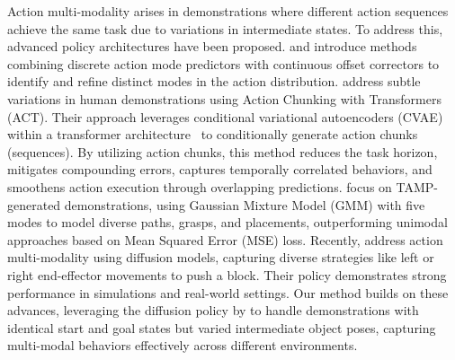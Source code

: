 Action multi-modality arises in demonstrations where different action sequences achieve the same task due to variations in intermediate states. To address this, advanced policy architectures have been proposed. \citet{lee2024behavior} and \citet{shafiullah2022behavior} introduce methods combining discrete action mode predictors with continuous offset correctors to identify and refine distinct modes in the action distribution. \citet{Zhao-RSS-23} address subtle variations in human demonstrations using Action Chunking with Transformers (ACT). Their approach leverages conditional variational autoencoders (CVAE) within a transformer architecture~\cite{vaswani2017attention} to conditionally generate action chunks (sequences). By utilizing action chunks, this method reduces the task horizon, mitigates compounding errors, captures temporally correlated behaviors, and smoothens action execution through overlapping predictions. \citet{dalal2023imitating} focus on TAMP-generated demonstrations, using Gaussian Mixture Model (GMM) with five modes to model diverse paths, grasps, and placements, outperforming unimodal approaches based on Mean Squared Error (MSE) loss. Recently, \citet{chi2023diffusion} address action multi-modality using diffusion models, capturing diverse strategies like left or right end-effector movements to push a block. Their policy demonstrates strong performance in simulations and real-world settings. Our method builds on these advances, leveraging the diffusion policy by \citet{chi2023diffusion} to handle demonstrations with identical start and goal states but varied intermediate object poses, capturing multi-modal behaviors effectively across different environments.


